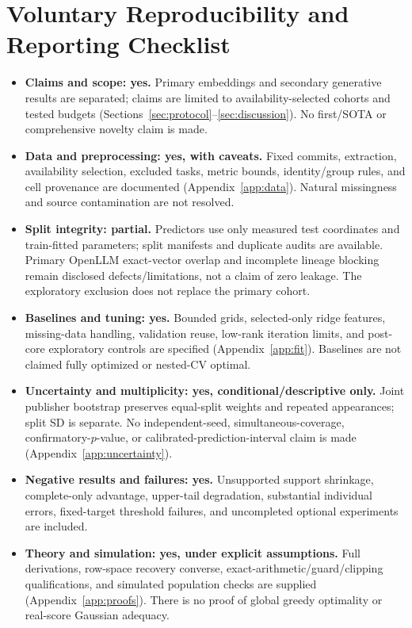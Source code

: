 \documentclass{article}
\begin{document}
\section{Voluntary Reproducibility and Reporting Checklist}
\label{app:checklist}
\begin{itemize}
\item \textbf{Claims and scope: yes.} Primary embeddings and secondary generative results are separated; claims are limited to availability-selected cohorts and tested budgets (Sections~\ref{sec:protocol}--\ref{sec:discussion}). No first/SOTA or comprehensive novelty claim is made.
\item \textbf{Data and preprocessing: yes, with caveats.} Fixed commits, extraction, availability selection, excluded tasks, metric bounds, identity/group rules, and cell provenance are documented (Appendix~\ref{app:data}). Natural missingness and source contamination are not resolved.
\item \textbf{Split integrity: partial.} Predictors use only measured test coordinates and train-fitted parameters; split manifests and duplicate audits are available. Primary OpenLLM exact-vector overlap and incomplete lineage blocking remain disclosed defects/limitations, not a claim of zero leakage. The exploratory exclusion does not replace the primary cohort.
\item \textbf{Baselines and tuning: yes.} Bounded grids, selected-only ridge features, missing-data handling, validation reuse, low-rank iteration limits, and post-core exploratory controls are specified (Appendix~\ref{app:fit}). Baselines are not claimed fully optimized or nested-CV optimal.
\item \textbf{Uncertainty and multiplicity: yes, conditional/descriptive only.} Joint publisher bootstrap preserves equal-split weights and repeated appearances; split SD is separate. No independent-seed, simultaneous-coverage, confirmatory-$p$-value, or calibrated-prediction-interval claim is made (Appendix~\ref{app:uncertainty}).
\item \textbf{Negative results and failures: yes.} Unsupported support shrinkage, complete-only advantage, upper-tail degradation, substantial individual errors, fixed-target threshold failures, and uncompleted optional experiments are included.
\item \textbf{Theory and simulation: yes, under explicit assumptions.} Full derivations, row-space recovery converse, exact-arithmetic/guard/clipping qualifications, and simulated population checks are supplied (Appendix~\ref{app:proofs}). There is no proof of global greedy optimality or real-score Gaussian adequacy.

\end{itemize}
\end{document}
